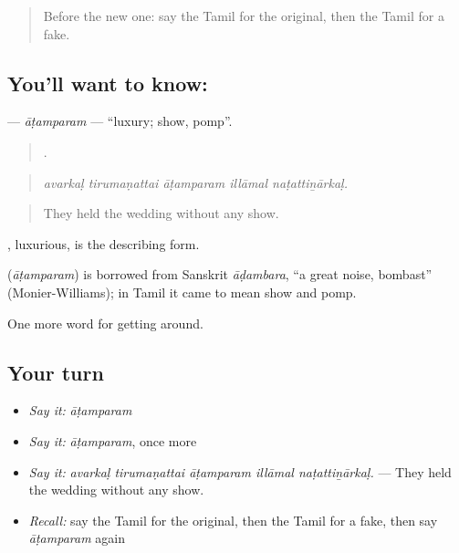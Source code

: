 \label{lesson:TA-C450-atamparam}



\begin{quote}
Before the new one: say the Tamil for the original, then the Tamil for a fake.
\end{quote}

\subsection*{You'll want to know: }
\textbf{} — \emph{āṭamparam} — \textquotedblleft{}luxury; show, pomp\textquotedblright{}.

\begin{quote}
    .
\end{quote}

\begin{quote}
\emph{avarkaḷ tirumaṇattai āṭamparam illāmal naṭattiṉārkaḷ.}
\end{quote}

\begin{quote}
They held the wedding without any show.
\end{quote}

, luxurious, is the describing form.

\begin{cousinweb}
\textbf{} (\emph{āṭamparam}) is borrowed from Sanskrit \emph{āḍambara}, \textquotedblleft{}a great noise, bombast\textquotedblright{} (Monier-Williams); in Tamil it came to mean show and pomp.
\end{cousinweb}

\begin{grammarlens}[title={What you've built}]
One more word for getting around.
\end{grammarlens}

\subsection*{Your turn}
\begin{itemize}
\raggedright
  \item \emph{Say it:} \emph{āṭamparam}
  \item \emph{Say it:} \emph{āṭamparam}, once more
  \item \emph{Say it:} \emph{avarkaḷ tirumaṇattai āṭamparam illāmal naṭattiṉārkaḷ.} — They held the wedding without any show.
  \item \emph{Recall:} say the Tamil for the original, then the Tamil for a fake, then say \emph{āṭamparam} again
\end{itemize}

